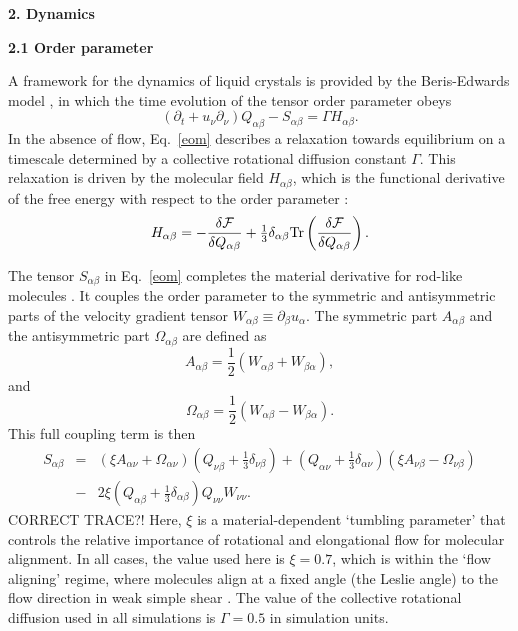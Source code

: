 \documentclass[12pt,twoside]{article}
\begin{document}
{\bf 2. Dynamics}

{\bf 2.1 Order parameter}

A framework for the dynamics of liquid crystals is provided by the 
Beris-Edwards model \cite{beris}, in which the time evolution of the
tensor order parameter obeys
\begin{equation}
\label{eom}
\left(\partial_t+ u_\nu \partial_\nu \right) Q_{\alpha\beta} - S_{\alpha\beta}
= \Gamma H_{\alpha\beta}.
\end{equation}
In the absence of flow, Eq.~\ref{eom} describes a relaxation towards
equilibrium on a timescale determined by a collective rotational diffusion 
constant $\Gamma$. This relaxation is driven by the molecular field
$H_{\alpha\beta}$, which is the functional derivative of the free energy
with respect to the order parameter \cite{beris}:
\begin{equation}
H_{\alpha\beta} = -\frac{\delta {\cal F}} {\delta Q_{\alpha\beta}} 
+ {\textstyle \frac{1}{3}} \delta_{\alpha\beta} 
\mathrm{Tr}\left(\frac{\delta {\cal F}}{\delta Q_{\alpha\beta}}\right).
\end{equation}

The tensor $S_{\alpha\beta}$ in Eq.~\ref{eom} completes the material
derivative for rod-like molecules \cite{beris}. It couples the order
parameter to the symmetric and antisymmetric parts of the velocity 
gradient tensor $W_{\alpha \beta}\equiv\partial_\beta u_\alpha$.
The symmetric part $A_{\alpha\beta}$ and the antisymmetric part
$\Omega_{\alpha\beta}$ are defined as 
\begin{equation}
A_{\alpha\beta} = {\textstyle \frac{1}{2}} (W_{\alpha\beta} + W_{\beta\alpha}),
\end{equation}
and
\begin{equation}
\Omega_{\alpha\beta} = {\textstyle \frac{1}{2}} (W_{\alpha\beta} - W_{\beta\alpha}).
\end{equation}
This full coupling term is then
\begin{eqnarray}
\label{coupling-term}
S_{\alpha\beta}  &=&
(\xi A_{\alpha\nu} + \Omega_{\alpha\nu})
(Q_{\nu\beta} + {\textstyle \frac{1}{3}}\delta_{\nu\beta})
+
(Q_{\alpha\nu} + {\textstyle \frac{1}{3}} \delta_{\alpha\nu})
(\xi A_{\nu\beta} - \Omega_{\nu\beta})
\nonumber\\ 
&-&2 \xi ({Q_{\alpha\beta} + {\textstyle \frac{1}{3}}\delta_{\alpha\beta}})
Q_{\nu\nu} W_{\nu\nu}.
\end{eqnarray}
CORRECT TRACE?!
Here, $\xi$ is a material-dependent `tumbling parameter' that controls the
relative importance of rotational and elongational flow for molecular
alignment. In all cases, the value used here is $\xi = 0.7$, which is within
the `flow aligning' regime, where molecules align at a fixed angle
(the Leslie angle) to the flow direction in weak simple shear \cite{deGennes}.
The value of the collective rotational diffusion used in all simulations is
$\Gamma = 0.5$ in simulation units.
\end{document}

